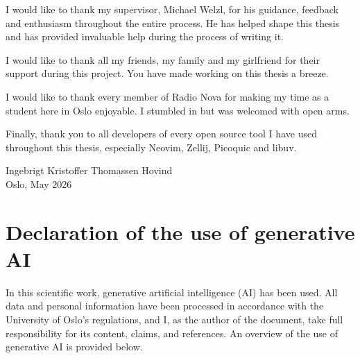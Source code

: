 \begin{preface}
  I would like to thank my supervisor, Michael Welzl, for his
  guidance, feedback and enthusiasm throughout the entire process. He
  has helped shape this thesis and has provided
  invaluable help during the process of writing it.

  I would like to thank all my friends, my family and my girlfriend
  for their support during this project. You have made working
  on this thesis a breeze.

  I would like to thank every member of Radio Nova for making
  my time as a student here in Oslo enjoyable. I stumbled in
  but was welcomed with open arms.

  Finally, thank you to all developers of every open source
  tool I have used throughout this thesis, especially
  Neovim, Zellij, Picoquic and libuv.
\begin{flushright}
  Ingebrigt Kristoffer Thomassen Hovind \\
  Oslo, May 2026
\end{flushright}
\end{preface}

\chapter*{Declaration of the use of generative AI}
In this scientific work, generative artificial intelligence (AI) has been used.
All data and personal information have been processed in accordance with the
University of Oslo's regulations, and I, as the author of the document,
take full responsibility for its content, claims, and references.
An overview of the use of generative AI is provided below.

